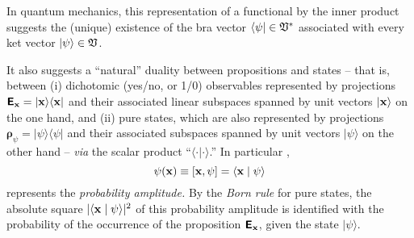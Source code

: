 {\color{Purple}
In quantum mechanics,
this representation of a functional by the inner product suggests
the (unique) existence of
the bra vector $\langle \psi \vert \in {\frak V}^*$
associated with every ket vector $\vert \psi \rangle \in {\frak V}$.

It also suggests a ``natural'' duality between
propositions and states
--
that is, between (i)
dichotomic (yes/no, or 1/0) observables
represented by projections $\textsf{\textbf{E}}_{\bf x}= \vert {\bf x} \rangle \langle {\bf x} \vert$
and their associated linear subspaces  spanned by unit vectors  $\vert {\bf x} \rangle $
on the one hand,
and (ii) pure states, which are also represented by projections $\boldsymbol{\rho}_{\psi}= \vert \psi \rangle \langle \psi \vert$
and their associated subspaces spanned by unit vectors  $ \vert {\psi} \rangle$
on the other hand
--
{\em via} the scalar product ``$\langle \cdot \vert \cdot \rangle$.''
In particular \cite{hamhalter-book},
\begin{equation}
{{\psi}} ({\bf x}) \equiv [{\bf x},  \psi ]= \langle {\bf x} \mid \psi \rangle
\end{equation}
represents the {\em probability amplitude.}
By the {\em Born rule}
for pure states,
the absolute square $\vert \langle {\bf x} \mid \psi \rangle \vert^2$
of this probability amplitude is identified with the probability of the occurrence of the proposition
$\textsf{\textbf{E}}_{\bf x}$,
given the state  $ \vert {\psi} \rangle$.

}
